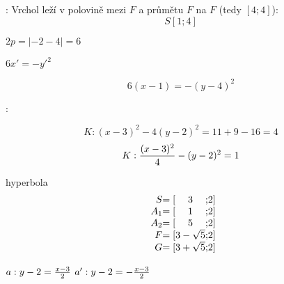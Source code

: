 
\BeginDoc{}
:
Vrchol leží v polovině mezi $F$ a průmětu $F$ na $F$ (tedy $[4;4]$):
$$S[1;4]$$

$2p =|-2-4| =6$

$6x' = -y'^2$

$$6(x-1) = -(y-4)^2 $$


:

$$K: (x-3)^2 - 4 (y-2)^2 = 11 + 9 - 16 = 4$$
$$K: \frac{(x-3)^2}4 -  (y-2)^2 = 1 $$

hyperbola
$$ 
\begin{array}{r@{=[}c@{;}c@{]}} 
	S & 3 & 2 \\
	A_1 & 1 & 2 \\
	A_2 & 5 & 2 \\
	F & 3- \sqrt 5 & 2 \\
	G & 3+ \sqrt 5 & 2 \\
\end{array}
$$

$ a: y-2 = \frac{x-3}2$
$ a': y-2 = -\frac{x-3}2$
\EndDoc

